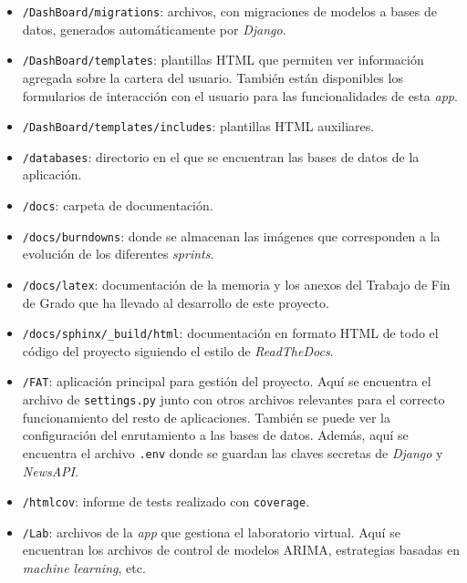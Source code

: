 \begin{itemize}
\item 
\texttt{/DashBoard/migrations}: archivos, con migraciones de modelos a bases de datos, generados automáticamente por \emph{Django}.

\item 
\texttt{/DashBoard/templates}: plantillas HTML que permiten ver información agregada sobre la cartera del usuario. También están disponibles los formularios de interacción con el usuario para las funcionalidades de esta \emph{app}.

\item 
\texttt{/DashBoard/templates/includes}: plantillas HTML auxiliares.

\item 
\texttt{/databases}: directorio en el que se encuentran las bases de datos de la aplicación. 

\item 
\texttt{/docs}: carpeta de documentación. 

\item 
\texttt{/docs/burndowns}: donde se almacenan las imágenes que corresponden a la evolución de los diferentes \emph{sprints}.

\item 
\texttt{/docs/latex}: documentación de la memoria y los anexos del Trabajo de Fin de Grado que ha llevado al desarrollo de este proyecto. 

\item 
\texttt{/docs/sphinx/\_build/html}: documentación en formato HTML de todo el código del proyecto siguiendo el estilo de \emph{ReadTheDocs}.

\item 
\texttt{/FAT}: aplicación principal para gestión del proyecto. Aquí se encuentra el archivo de \texttt{settings.py} junto con otros archivos relevantes para el correcto funcionamiento del resto de aplicaciones. También se puede ver la configuración del enrutamiento a las bases de datos. Además, aquí se encuentra el archivo \texttt{.env} donde se guardan las claves secretas de \emph{Django} y \emph{NewsAPI}.

\item 
\texttt{/htmlcov}: informe de tests realizado con \texttt{coverage}.

\item 
\texttt{/Lab}: archivos de la \emph{app} que gestiona el laboratorio virtual. Aquí se encuentran los archivos de control de modelos ARIMA, estrategias basadas en \emph{machine learning}, etc. 


\end{itemize}
